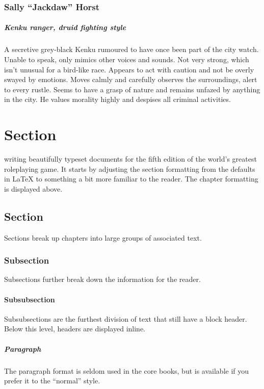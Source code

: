 \documentclass[10pt,twoside,twocolumn,openany,nodepracetedcode]{dndbook}
\begin{document}
\begin{onecolumn}
  \subsection{Sally “Jackdaw” Horst}
  \paragraph{Kenku ranger, druid fighting style}
  A secretive grey-black Kenku rumoured to have once been part of the city watch. Unable to speak, only mimics other voices and sounds. Not very strong, which isn't unusual for a bird-like race. Appears to act with caution and not be overly swayed by emotions. Moves calmly and carefully observes the surroundings, alert to every rustle. Seems to have a grasp of nature and remains unfazed by anything in the city. He values morality highly and despises all criminal activities.

  \pagebreak
\end{onecolumn}

\chapter{Section}

 writing beautifully typeset documents for the fifth edition of the world's greatest roleplaying game. It starts by adjusting the section formatting from the defaults in \LaTeX{} to something a bit more familiar to the reader. The chapter formatting is displayed above.

\section{Section}
Sections break up chapters into large groups of associated text.

\subsection{Subsection}
Subsections further break down the information for the reader.

\subsubsection{Subsubsection}
Subsubsections are the furthest division of text that still have a block header. Below this level, headers are displayed inline.

\paragraph{Paragraph}
The paragraph format is seldom used in the core books, but is available if you prefer it to the ``normal'' style.
\end{document}
